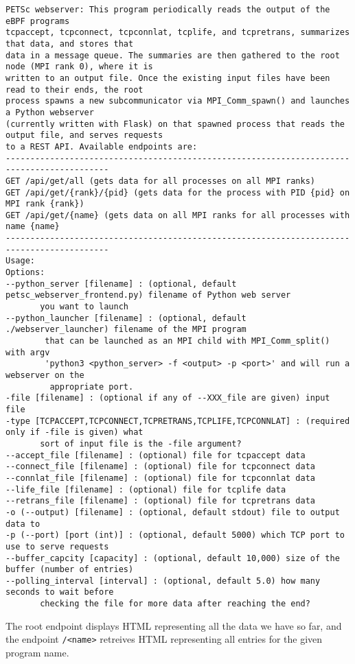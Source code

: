 \begin{Verbatim}[xleftmargin=-3cm]
PETSc webserver: This program periodically reads the output of the eBPF programs
tcpaccept, tcpconnect, tcpconnlat, tcplife, and tcpretrans, summarizes that data, and stores that
data in a message queue. The summaries are then gathered to the root node (MPI rank 0), where it is
written to an output file. Once the existing input files have been read to their ends, the root
process spawns a new subcommunicator via MPI_Comm_spawn() and launches a Python webserver
(currently written with Flask) on that spawned process that reads the output file, and serves requests
to a REST API. Available endpoints are:
-------------------------------------------------------------------------------------------
GET /api/get/all (gets data for all processes on all MPI ranks)
GET /api/get/{rank}/{pid} (gets data for the process with PID {pid} on MPI rank {rank})
GET /api/get/{name} (gets data on all MPI ranks for all processes with name {name}
-------------------------------------------------------------------------------------------
Usage:
Options:
--python_server [filename] : (optional, default petsc_webserver_frontend.py) filename of Python web server
       you want to launch
--python_launcher [filename] : (optional, default ./webserver_launcher) filename of the MPI program
        that can be launched as an MPI child with MPI_Comm_split() with argv
        'python3 <python_server> -f <output> -p <port>' and will run a webserver on the
         appropriate port.
-file [filename] : (optional if any of --XXX_file are given) input file
-type [TCPACCEPT,TCPCONNECT,TCPRETRANS,TCPLIFE,TCPCONNLAT] : (required only if -file is given) what
       sort of input file is the -file argument?
--accept_file [filename] : (optional) file for tcpaccept data
--connect_file [filename] : (optional) file for tcpconnect data
--connlat_file [filename] : (optional) file for tcpconnlat data
--life_file [filename] : (optional) file for tcplife data
--retrans_file [filename] : (optional) file for tcpretrans data
-o (--output) [filename] : (optional, default stdout) file to output data to
-p (--port) [port (int)] : (optional, default 5000) which TCP port to use to serve requests
--buffer_capcity [capacity] : (optional, default 10,000) size of the buffer (number of entries)
--polling_interval [interval] : (optional, default 5.0) how many seconds to wait before
       checking the file for more data after reaching the end?
\end{Verbatim}
The root endpoint displays HTML representing all the data we have so far, and the endpoint \lstinline{/<name>} retreives HTML representing all entries for the given program name.
